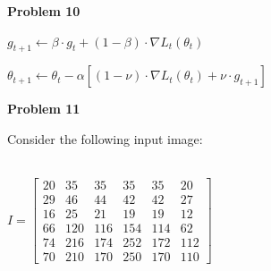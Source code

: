 \documentclass{article}
\begin{document}
\newpage
\noindent \textbf{Problem 10} \\

\begin{center}
$g_{t+1} \leftarrow \beta \cdot g_t + (1 - \beta) \cdot \nabla L_t(\theta_t) $
\end{center}
\begin{center}
$\theta_{t+1} \leftarrow \theta_t - \alpha \left[ (1 - \nu) \cdot \nabla L_t(\theta_t) + \nu \cdot g_{t+1} \right] $
\end{center}







\newpage
\noindent \textbf{Problem 11}

\noindent Consider the following input image: \\ \\
\begin{center}  

 $ I = \begin{bmatrix}
    20 & 35 & 35 & 35 &35 & 20 \\
    29 & 46 & 44 & 42 &42 & 27 \\
    16 & 25 & 21 & 19 &19 & 12 \\
    66 & 120 & 116 & 154 &114 & 62 \\
    74 & 216 & 174 & 252 &172 & 112 \\
    70 & 210 & 170 & 250 &170 & 110
  \end{bmatrix}$ 
\end{center}
\end{document}
